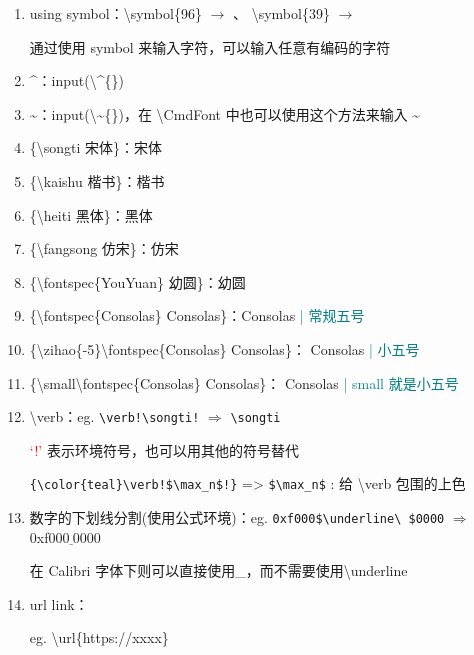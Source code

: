 \begin{enumerate}[topsep=0pt,itemsep=0pt,parsep=0pt,leftmargin=3.6em,label=\arabic*>]
    \item using symbol：\textbackslash symbol\{96\} {\color{DefinedColorRed}$\to$}  、
        \textbackslash symbol\{39\} {\color{DefinedColorRed}$\to$}  \par
        通过使用 symbol 来输入字符，可以输入任意有编码的字符
    \item \^{}：input(\textbackslash \^{}\{\})
    \item \~{}：input(\textbackslash \~{}\{\})，在 \textbackslash CmdFont 中也可以使用这个方法来输入 \~{}
    \item \{\textbackslash songti 宋体\}：{\songti 宋体}
    \item \{\textbackslash kaishu 楷书\}：{\kaishu 楷书}
    \item \{\textbackslash heiti 黑体\}：{\heiti 黑体}
    \item \{\textbackslash fangsong 仿宋\}：{\fangsong 仿宋}
    \item \{\textbackslash fontspec\{YouYuan\} 幼圆\}：{幼圆}  %
    \item \{\textbackslash fontspec\{Consolas\} Consolas\}：{Consolas}  %
        \textcolor{teal}{| 常规五号}
    \item \{\textbackslash zihao\{-5\}\textbackslash fontspec\{Consolas\} Consolas\}：
        {Consolas}  %
        \textcolor{teal}{| 小五号}
    \item \{\textbackslash small\textbackslash fontspec\{Consolas\} Consolas\}：
        {\small{}Consolas}  %
        \textcolor{teal}{| small 就是小五号}
    \item \textbackslash verb：eg. \verb'\verb!\songti!' 
        $\Rightarrow$ %
        \verb!\songti! \par
        \textcolor{red}{`!'} 表示环境符号，也可以用其他的符号替代 \par
        \verb={\color{teal}\verb!$\max_n$!}= => {\color{teal}\verb!$\max_n$!} : 给 \textbackslash verb 包围的上色
    \item 数字的下划线分割(使用公式环境)：eg. \verb=0xf000$\underline\ $0000= 
        $\Rightarrow$ 
        0xf000$\underline\ $0000 \par
        {\color{teal}在 Calibri 字体下则可以直接使用\_，而不需要使用\textbackslash underline}
    \item url link：\par
        eg. \textbackslash url\{https://xxxx\} 

\end{enumerate}
